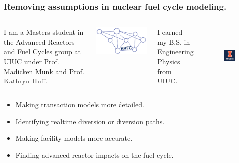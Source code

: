\documentclass[9pt]{beamer}
\begin{document}
  \begin{frame}
    \frametitle{Removing assumptions in nuclear fuel cycle modeling.}
    \begin{columns}
      \column[t]{5cm}
      I am a Masters student in the Advanced Reactors and Fuel Cycles group at
      UIUC under Prof. Madicken Munk and Prof. Kathryn Huff.
      \begin{center}
              \includegraphics[height=0.2\textheight]{./images/arfc-logo}
      \end{center}

      \column[t]{5cm}
      I earned my B.S. in Engineering Physics from UIUC.
      \begin{figure}[htbp!]
        \begin{center}
          \includegraphics[height=3cm]{./images/ill_phys.png}
        \end{center}
        \label{fig:uiuc_phys}
      \end{figure}
    \end{columns}\pause
    \begin{itemize}[<+->]
      \item Making transaction models more detailed.
      \item Identifying realtime diversion or diversion paths.
      \item Making facility models more accurate.
      \item Finding advanced reactor impacts on the fuel cycle.
    \end{itemize}
  \end{frame}
\end{document}
